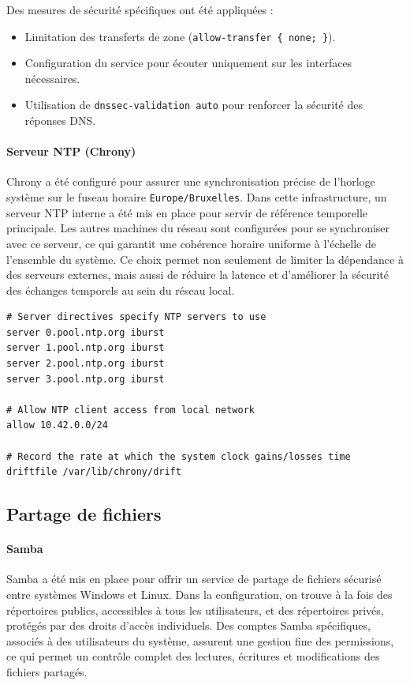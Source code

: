 \documentclass[a4paper,12pt]{article}
\begin{document}
Des mesures de sécurité spécifiques ont été appliquées :
\begin{itemize}
    \item Limitation des transferts de zone (\texttt{allow-transfer \{ none; \}}).
    \item Configuration du service pour écouter uniquement sur les interfaces nécessaires.
    \item Utilisation de \texttt{dnssec-validation auto} pour renforcer la sécurité des réponses DNS.
\end{itemize}

\paragraph{Serveur NTP (Chrony)}

Chrony a été configuré pour assurer une synchronisation précise de l'horloge système sur le fuseau horaire \texttt{Europe/Bruxelles}. Dans cette infrastructure, un serveur NTP interne a été mis en place pour servir de référence temporelle principale. Les autres machines du réseau sont configurées pour se synchroniser avec ce serveur, ce qui garantit une cohérence horaire uniforme à l'échelle de l'ensemble du système. Ce choix permet non seulement de limiter la dépendance à des serveurs externes, mais aussi de réduire la latence et d'améliorer la sécurité des échanges temporels au sein du réseau local.

\begin{lstlisting}[caption={Configuration NTP Chrony – /etc/chrony.conf}]
# Server directives specify NTP servers to use
server 0.pool.ntp.org iburst
server 1.pool.ntp.org iburst
server 2.pool.ntp.org iburst
server 3.pool.ntp.org iburst

# Allow NTP client access from local network
allow 10.42.0.0/24

# Record the rate at which the system clock gains/losses time
driftfile /var/lib/chrony/drift
\end{lstlisting}

\subsection{Partage de fichiers}

\paragraph{Samba}

Samba a été mis en place pour offrir un service de partage de fichiers sécurisé entre systèmes Windows et Linux. Dans la configuration, on trouve à la fois des répertoires publics, accessibles à tous les utilisateurs, et des répertoires privés, protégés par des droits d'accès individuels. Des comptes Samba spécifiques, associés à des utilisateurs du système, assurent une gestion fine des permissions, ce qui permet un contrôle complet des lectures, écritures et modifications des fichiers partagés.
\end{document}
